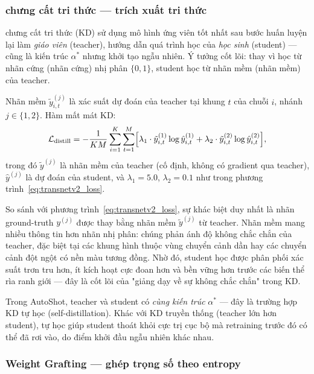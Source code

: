 \subsubsection{chưng cất tri thức — trích xuất tri thức}
\label{subsubsec:kd}

chưng cất tri thức (KD) \cite{hinton2015distilling} sử dụng mô hình ứng viên tốt nhất sau bước huấn luyện lại làm \textit{giáo viên} (teacher), hướng dẫn quá trình học của \textit{học sinh} (student) — cũng là kiến trúc $\alpha^*$ nhưng khởi tạo ngẫu nhiên. Ý tưởng cốt lõi: thay vì học từ nhãn cứng (nhãn cứng) nhị phân $\{0, 1\}$, student học từ nhãn mềm (nhãn mềm) của teacher.

Nhãn mềm $\tilde{y}^{(j)}_{i,t}$ là xác suất dự đoán của teacher tại khung $t$ của chuỗi $i$, nhánh $j \in \{1, 2\}$. Hàm mất mát KD:
\begin{equation}
    \mathcal{L}_{\mathrm{distill}}
    = -\frac{1}{KM} \sum_{i=1}^{K} \sum_{t=1}^{M}
      \Bigl[
        \lambda_1 \cdot \tilde{y}^{(1)}_{i,t} \log \hat{y}^{(1)}_{i,t}
        + \lambda_2 \cdot \tilde{y}^{(2)}_{i,t} \log \hat{y}^{(2)}_{i,t}
      \Bigr],
    \label{eq:kd_loss}
\end{equation}
trong đó $\tilde{y}^{(j)}$ là nhãn mềm của teacher (cố định, không có gradient qua teacher), $\hat{y}^{(j)}$ là dự đoán của student, và $\lambda_1 = 5.0$, $\lambda_2 = 0.1$ như trong phương trình~\eqref{eq:transnetv2_loss}.

So sánh với phương trình~\eqref{eq:transnetv2_loss}, sự khác biệt duy nhất là nhãn ground-truth $y^{(j)}$ được thay bằng nhãn mềm $\tilde{y}^{(j)}$ từ teacher. Nhãn mềm mang nhiều thông tin hơn nhãn nhị phân: chúng phản ánh độ không chắc chắn của teacher, đặc biệt tại các khung hình thuộc vùng chuyển cảnh dần hay các chuyển cảnh đột ngột có nền màu tương đồng. Nhờ đó, student học được phân phối xác suất trơn tru hơn, ít kích hoạt cực đoan hơn và bền vững hơn trước các biến thể rìa ranh giới — đây là cốt lõi của "giảng dạy về sự không chắc chắn" trong KD.

Trong AutoShot, teacher và student có \textit{cùng kiến trúc} $\alpha^*$ — đây là trường hợp KD tự học (self-distillation). Khác với KD truyền thống (teacher lớn hơn student), tự học giúp student thoát khỏi cực trị cục bộ mà retraining trước đó có thể đã rơi vào, do điểm khởi đầu ngẫu nhiên khác nhau.

\subsubsection{Weight Grafting — ghép trọng số theo entropy}
\label{subsubsec:grafting}


